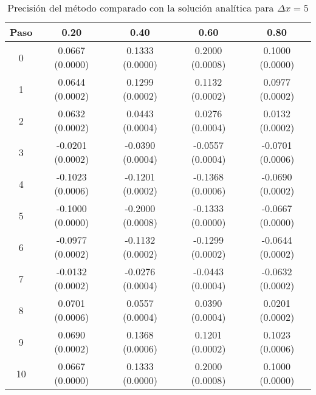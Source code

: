 \documentclass[11pt]{article}
\begin{document}
\begin{table}
\begin{tabular}{ c c c c c }
\hline
Paso & 0.20 & 0.40 & 0.60 & 0.80 \\
\hline
\hline
0 & 0.0667 (0.0000) & 0.1333 (0.0000) & 0.2000 (0.0008) & 0.1000 (0.0000) \\
1 & 0.0644 (0.0002) & 0.1299 (0.0002) & 0.1132 (0.0002) & 0.0977 (0.0002) \\
2 & 0.0632 (0.0002) & 0.0443 (0.0004) & 0.0276 (0.0004) & 0.0132 (0.0002) \\
3 & -0.0201 (0.0002) & -0.0390 (0.0004) & -0.0557 (0.0004) & -0.0701 (0.0006) \\
4 & -0.1023 (0.0006) & -0.1201 (0.0002) & -0.1368 (0.0006) & -0.0690 (0.0002) \\
5 & -0.1000 (0.0000) & -0.2000 (0.0008) & -0.1333 (0.0000) & -0.0667 (0.0000) \\
6 & -0.0977 (0.0002) & -0.1132 (0.0002) & -0.1299 (0.0002) & -0.0644 (0.0002) \\
7 & -0.0132 (0.0002) & -0.0276 (0.0004) & -0.0443 (0.0004) & -0.0632 (0.0002) \\
8 & 0.0701 (0.0006) & 0.0557 (0.0004) & 0.0390 (0.0004) & 0.0201 (0.0002) \\
9 & 0.0690 (0.0002) & 0.1368 (0.0006) & 0.1201 (0.0002) & 0.1023 (0.0006) \\
10 & 0.0667 (0.0000) & 0.1333 (0.0000) & 0.2000 (0.0008) & 0.1000 (0.0000) \\
\end{tabular}
\caption{Precisión del método comparado con la solución analítica para $\Delta{x} = 5$}
\label{eq:compartiva1}
\end{table}
\end{document}
